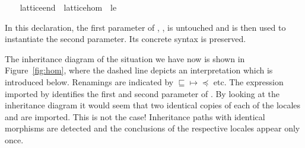 \begin{isabellebody}
\begin{isamarkuptext}
\end{isamarkuptext}%
\isamarkuptrue%
\ \ \isamarkupfalse%
\ lattice{\isacharunderscore}end\ {\isacharequal}\ lattice{\isacharunderscore}hom\ {\isacharunderscore}\ le%
\begin{isamarkuptext}%
In this declaration, the first parameter of , , is untouched and is then used to instantiate
  the second parameter.  Its concrete syntax is preserved.%
\end{isamarkuptext}%
\isamarkuptrue%
%
\begin{isamarkuptext}%
The inheritance diagram of the situation we have now is shown
  in Figure~\ref{fig:hom}, where the dashed line depicts an
  interpretation which is introduced below.  Renamings are
  indicated by $\sqsubseteq \mapsto \preceq$ etc.  The expression
  imported by  identifies the first and second
  parameter of .  By looking at the inheritance diagram it would seem
  that two identical copies of each of the locales  and  are imported.  This is not the
  case!  Inheritance paths with identical morphisms are detected and
  the conclusions of the respective locales appear only once.


\end{isamarkuptext}
\end{isabellebody}
